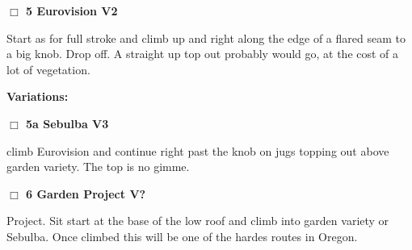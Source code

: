 \begin{multicols}{2}
\needspace{2em}
\label{rt:Eurovision}
\colorbox{green!20}{
\parbox{0.95\linewidth}{
\hspace{-1ex}\textbf{$\Box$
5 Eurovision V2  
}}}
\begin{adjustwidth}{1.3em}{}			

Start as for full stroke and climb up and right along the edge of a flared seam to a big knob. Drop off. A straight up top out probably would go, at the cost of a lot of vegetation.
\end{adjustwidth}


\begin{adjustwidth}{0.5cm}{}				
\needspace{4em}
\textbf{Variations:} \newline

\needspace{2em}
\label{vr:Sebulba}
\colorbox{green!20}{
\parbox{0.95\linewidth}{
\hspace{-1ex}\textbf{$\Box$
5a Sebulba V3  \warn
}}}
\begin{adjustwidth}{1.3em}{}			

climb Eurovision and continue right past the knob on jugs topping out above garden variety. The top is no gimme.
\end{adjustwidth}



\end{adjustwidth}


\needspace{2em}
\label{rt:Garden Project}
\colorbox{black!20}{
\parbox{0.95\linewidth}{
\hspace{-1ex}\textbf{$\Box$
6 Garden Project V?  
}}}
\begin{adjustwidth}{1.3em}{}			

Project. Sit start at the base of the low roof and climb into garden variety or Sebulba. Once climbed this will be one of the hardes routes in Oregon.
\end{adjustwidth}



	\end{multicols}
\label{tp:arboretum2}
  \begin{landscape}
	
  \end{landscape}

